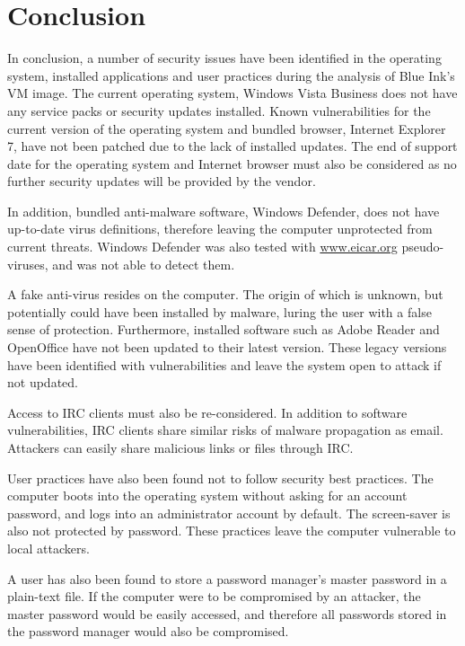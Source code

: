 \section{Conclusion}

In conclusion, a number of security issues have been identified in the operating system, installed applications and user practices during the analysis of Blue Ink's VM image. The current operating system, Windows Vista Business does not have any service packs or security updates installed. Known vulnerabilities for the current version of the operating system and bundled browser, Internet Explorer 7, have not been patched due to the lack of installed updates. The end of support date for the operating system and Internet browser must also be considered as no further security updates will be provided by the vendor.

In addition, bundled anti-malware software, Windows Defender, does not have up-to-date virus definitions, therefore leaving the computer unprotected from current threats. Windows Defender was also tested with \href{http://www.eicar.org/85-0-Download.html}{www.eicar.org} pseudo-viruses, and was not able to detect them.

A fake anti-virus resides on the computer. The origin of which is unknown, but potentially could have been installed by malware, luring the user with a false sense of protection. Furthermore, installed software such as Adobe Reader and OpenOffice have not been updated to their latest version. These legacy versions have been identified with vulnerabilities and leave the system open to attack if not updated.

Access to IRC clients must also be re-considered. In addition to software vulnerabilities, IRC clients share similar risks of malware propagation as email. Attackers can easily share malicious links or files through IRC.

User practices have also been found not to follow security best practices. The computer boots into the operating system without asking for an account password, and logs into an administrator account by default. The screen-saver is also not protected by password. These practices leave the computer vulnerable to local attackers.

A user has also been found to store a password manager's master password in a plain-text file. If the computer were to be compromised by an attacker, the master password would be easily accessed, and therefore all passwords stored in the password manager would also be compromised.

